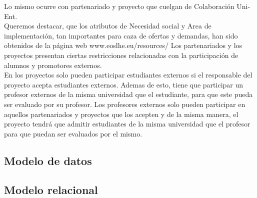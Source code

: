\documentclass{article}
\begin{document}
Lo mismo ocurre con partenariado y proyecto que cuelgan de Colaboración Uni-Ent.\\
Queremos destacar, que los atributos de Necesidad social y Area de implementación, tan importantes para caza de ofertas y demandas, han sido obtenidos de la página web www.eoslhe.eu/resources/
Los partenariados y los proyectos presentan ciertas restricciones relacionadas con la participación de alumnos y promotores externos.\\
En los proyectos solo pueden participar estudiantes externos si el responsable del proyecto acepta estudiantes externos.  Ademas de esto, tiene que participar un profesor externos de la misma universidad que el estudiante, para que este pueda ser evaluado por su profesor.
Los profesores externos solo pueden participar en aquellos partenariados y proyectos que los acepten y de la misma manera, el proyecto tendrá que admitir estudiantes de la misma universidad que el profesor para que puedan ser evaluados por el mismo.\\
\subsection{Modelo de datos}
\subsection{Modelo relacional}



\end{document}
